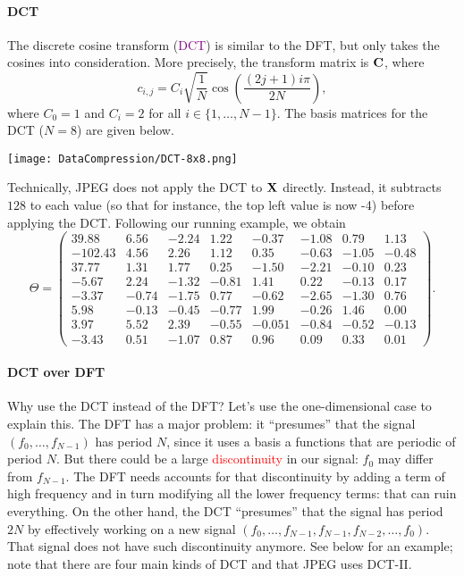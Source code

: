 \documentclass[a4paper, 11pt, openany]{book}
\numberwithin{equation}{section}
\theoremstyle{plain}
\theoremstyle{definition}
\newcommand{\Important}[1]{\textcolor{red}{#1}}
\newcommand{\Define}[1]{\textcolor{purple}{#1}}
\begin{document}
\paragraph{DCT}
The discrete cosine transform (\Define{DCT}) is similar to the DFT, but only takes the cosines into consideration. More precisely, the transform matrix is ${\bf C}$, where
\[
    c_{i,j} = C_i \sqrt{ \frac{1}{N} } \cos \left( \frac{(2j+1)i \pi}{2 N} \right),
\]
where $C_0 = 1$ and $C_i = 2$ for all $i \in \{1, \dots, N-1\}$. The basis matrices for the DCT ($N=8$) are given below.

\begin{center}
\texttt{[image: DataCompression/DCT-8x8.png]}
\end{center}

Technically, JPEG does not apply the DCT to ${\bf X}$ directly. Instead, it subtracts $128$ to each value (so that for instance, the top left value is now -4) before applying the DCT. Following our running example, we obtain
\[
    \Theta = \begin{pmatrix}
    39.88 & 6.56 & -2.24 & 1.22 & -0.37 & -1.08 & 0.79 & 1.13\\
    -102.43 & 4.56 & 2.26 & 1.12 & 0.35 & -0.63 & -1.05 & -0.48\\
    37.77 & 1.31 & 1.77 & 0.25 & -1.50 & -2.21 & -0.10 & 0.23\\
    -5.67 & 2.24 & -1.32 & -0.81 & 1.41 & 0.22 & -0.13 & 0.17\\
    -3.37 & -0.74 & -1.75 & 0.77 & -0.62 & -2.65 & -1.30 & 0.76\\
    5.98 & -0.13 & -0.45 & -0.77 & 1.99 & -0.26 & 1.46 & 0.00\\
    3.97 & 5.52 & 2.39 & -0.55 & -0.051 & -0.84 & -0.52 & -0.13\\
    -3.43 & 0.51 & -1.07 & 0.87 & 0.96 & 0.09 & 0.33 & 0.01
    \end{pmatrix}.
\]



\paragraph{DCT over DFT} Why use the DCT instead of the DFT? Let's use the one-dimensional case to explain this. The DFT has a major problem: it ``presumes'' that the signal $(f_0, \dots, f_{N-1})$ has period $N$, since it uses a basis a functions that are periodic of period $N$. But there could be a large \Important{discontinuity} in our signal: $f_0$ may differ from $f_{N-1}$. The DFT needs accounts for that discontinuity by adding a term of high frequency and in turn modifying all the lower frequency terms: that can ruin everything. On the other hand, the DCT ``presumes'' that the signal has period $2N$ by effectively working on a new signal $(f_0, \dots, f_{N-1}, f_{N-1}, f_{N-2}, \dots, f_0)$. That signal does not have such discontinuity anymore. See below for an example; note that there are four main kinds of DCT and that JPEG uses DCT-II.
\end{document}
